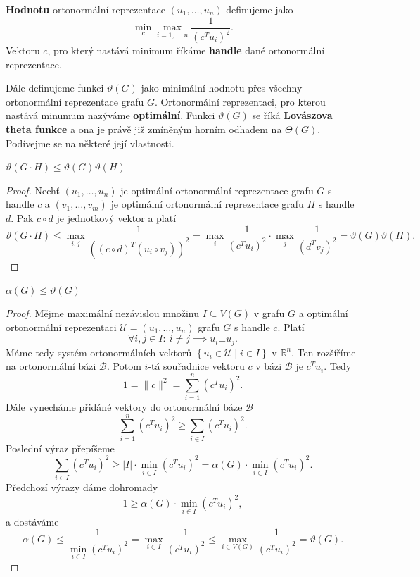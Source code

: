 \noindent \textbf{Hodnotu} ortonormální reprezentace $\left(u_1, \dots, u_n \right)$ definujeme jako
$$
    \min_c \max_{i = 1, \dots, n} \frac{1}{\left( c^T u_i \right)^2}.
$$
Vektoru $c$, pro který nastává minimum říkáme \textbf{handle} dané ortonormální reprezentace.

Dále definujeme funkci $\vartheta(G)$ jako minimální hodnotu přes všechny ortonormální reprezentace grafu $G$. Ortonormální reprezentaci, pro kterou nastává minumum nazýváme \textbf{optimální}. Funkci $\vartheta(G)$ se říká \textbf{Lovászova theta funkce} a ona je právě již zmíněným horním odhadem na $\Theta(G)$. Podívejme se na některé její vlastnosti.

\begin{lm}
    $\vartheta(G \cdot H) \leq \vartheta(G) \vartheta(H)$
\end{lm}

\begin{proof}
    Nechť $\left( u_1, \dots, u_n \right)$ je optimální ortonormální reprezentace grafu $G$ s handle $c$ a $\left( v_1, \dots, v_m \right)$ je optimální ortonormální reprezentace grafu $H$ s handle $d$. Pak $c \circ d$ je jednotkový vektor a platí
    $$
        \vartheta(G \cdot H) \leq \max_{i,j} \frac{1}{\left( \left( c \circ d \right)^T \left( u_i \circ v_j \right) \right)^2} = \max_i \frac{1}{\left( c^T u_i \right)^2} \cdot \max_j \frac{1}{\left( d^T v_j \right)^2} = \vartheta(G)\vartheta(H).
    $$
\end{proof}

\begin{lm}
    $\alpha(G) \leq \vartheta(G)$
\end{lm}

\begin{proof}
    Mějme maximální nezávislou množinu $I \subseteq V(G)$ v grafu $G$ a optimální ortonormální reprezentaci $\mathcal{U} = \left( u_1, \dots, u_n \right)$ grafu $G$ s handle $c$. Platí
    $$
        \forall i,j \in I:\ i \neq j \implies u_i \bot u_j.
    $$
    Máme tedy systém ortonormálních vektorů $\left\{ u_i \in \mathcal{U} \mid i \in I \right\}$ v $\mathbb{R}^n$. Ten rozšíříme na ortonormální bázi $\mathcal{B}$. Potom $i$-tá souřadnice vektoru $c$ v bázi $\mathcal{B}$ je $c^T u_i$. Tedy
    $$
        1 = \| c \|^2 = \sum_{i=1}^n \left( c^T u_i \right)^2.
    $$
    Dále vynecháme přidáné vektory do ortonormální báze $\mathcal{B}$
    $$
        \sum_{i=1}^n \left( c^T u_i \right)^2 \geq \sum_{i \in I} \left( c^T u_i \right)^2.
    $$
    Poslední výraz přepíšeme
    $$
        \sum_{i \in I} \left( c^T u_i \right)^2 \geq |I| \cdot \min_{i \in I}\left( c^T u_i \right)^2 = \alpha(G) \cdot \min_{i \in I}\left( c^T u_i \right)^2.
    $$
    Předchozí výrazy dáme dohromady
    $$
        1 \geq \alpha(G) \cdot \min_{i \in I}\left( c^T u_i \right)^2,
    $$
    a dostáváme
    $$
        \alpha(G) \leq \frac{1}{\min_{i \in I}\left( c^T u_i \right)^2} = \max_{i \in I} \frac{1}{\left( c^T u_i \right)^2} \leq \max_{i \in V(G)} \frac{1}{\left( c^T u_i \right)^2} = \vartheta(G).
    $$
\end{proof}

